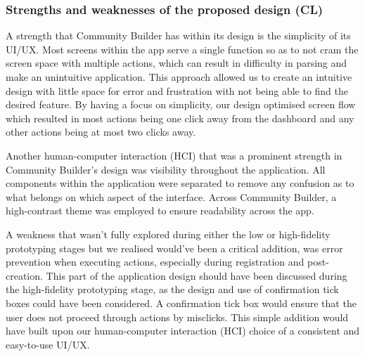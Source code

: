 \documentclass[a4paper,12pt]{article}
\begin{document}
\subsubsection{Strengths and weaknesses of the proposed design (CL)}
A strength that Community Builder has within its design is the simplicity of its UI/UX. Most screens within the app serve a single function so as to not cram the screen space with multiple actions, which can result in difficulty in parsing and make an unintuitive application. This approach allowed us to create an intuitive design with little space for error and frustration with not being able to find the desired feature. By having a focus on simplicity, our design optimised screen flow which resulted in most actions being one click away from the dashboard and any other actions being at most two clicks away.

Another human-computer interaction (HCI) that was a prominent strength in Community Builder's design was visibility throughout the application. All components within the application were separated to remove any confusion as to what belongs on which aspect of the interface. Across Community Builder, a high-contrast theme was employed to ensure readability across the app. 

A weakness that wasn't fully explored during either the low or high-fidelity prototyping stages but we realised would've been a critical addition, was error prevention when executing actions, especially during registration and post-creation. This part of the application design should have been discussed during the high-fidelity prototyping stage, as the design and use of confirmation tick boxes could have been considered. A confirmation tick box would ensure that the user does not proceed through actions by misclicks. This simple addition would have built upon our human-computer interaction (HCI) choice of a consistent and easy-to-use UI/UX.
\end{document}

